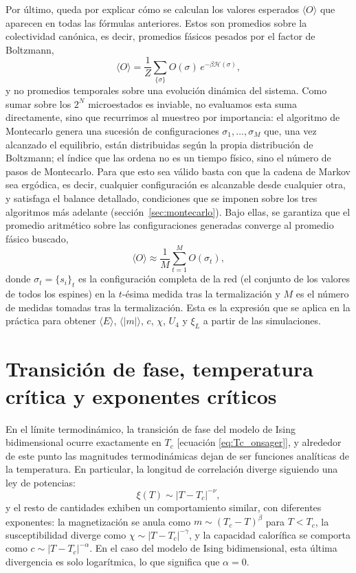 Por último, queda por explicar cómo se calculan los valores esperados $\langle O \rangle$
que aparecen en todas las fórmulas anteriores. Estos son promedios sobre la colectividad
canónica, es decir, promedios fásicos pesados por el factor de Boltzmann,
\[
\langle O \rangle = \frac{1}{Z}\sum_{\{\sigma\}} O(\sigma)\,e^{-\beta\mathcal{H}(\sigma)},
\]
y no promedios temporales sobre una evolución dinámica del sistema. Como sumar sobre los
$2^N$ microestados es inviable, no evaluamos esta suma directamente, sino que recurrimos al muestreo por importancia: el algoritmo de Montecarlo genera una sucesión de configuraciones $\sigma_1,\dots,\sigma_M$ que, una vez alcanzado el equilibrio, están distribuidas según la propia distribución de Boltzmann; el índice que las ordena no es un tiempo físico, sino el número de pasos de Montecarlo. Para que esto sea válido basta con que la cadena de Markov sea ergódica, es decir, cualquier configuración es alcanzable desde cualquier otra, y satisfaga el balance detallado, condiciones que se imponen sobre los tres algoritmos más adelante (sección~\ref{sec:montecarlo}). Bajo ellas, se garantiza que el promedio aritmético sobre las configuraciones generadas converge al promedio fásico
buscado,
\[
\langle O \rangle \approx \frac{1}{M}\sum_{t=1}^{M} O(\sigma_t),
\]
donde $\sigma_t = \{s_i\}_t$ es la configuración completa de la red (el conjunto de los valores de todos los espines) en la $t$-ésima medida tras la termalización y $M$ es el número de medidas tomadas tras la termalización. Esta es la expresión que se aplica en la práctica para obtener $\langle E \rangle$, $\langle |m| \rangle$, $c$, $\chi$, $U_4$ y $\xi_L$ a partir de las simulaciones.




\section{Transición de fase, temperatura crítica y exponentes críticos}

En el límite termodinámico, la transición de fase del modelo de Ising bidimensional ocurre exactamente en $T_c$ [ecuación \eqref{eq:Tc_onsager}], y alrededor de este punto las magnitudes termodinámicas dejan de ser funciones analíticas de la temperatura. En particular, la longitud de correlación diverge siguiendo una ley de potencias:
\[
\xi(T) \sim |T-T_c|^{-\nu},
\]
y el resto de cantidades exhiben un comportamiento similar, con diferentes exponentes: la magnetización se anula como $m \sim (T_c-T)^{\beta}$ para $T<T_c$, la susceptibilidad diverge como $\chi \sim |T-T_c|^{-\gamma}$, y la capacidad calorífica se comporta como $c \sim |T-T_c|^{-\alpha}$. En el caso del modelo de Ising bidimensional, esta última divergencia es solo logarítmica, lo que significa que $\alpha=0$.

